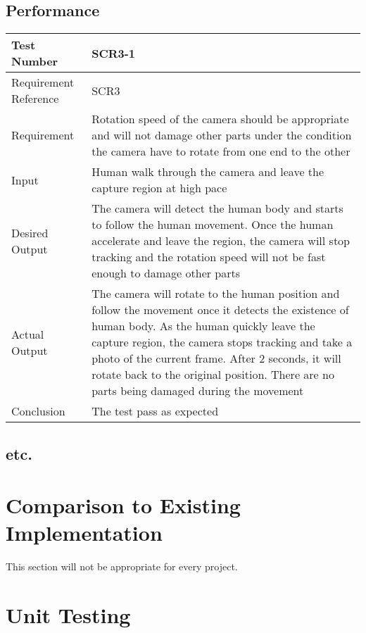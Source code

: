 \documentclass[12pt, titlepage]{article}
\begin{document}
\subsection{Performance}
\begin{table}[H]
\begin{center}
\begin{tabular}{|p{} | p{}|}
\hline
  Test Number & SCR3-1\\
  \hline
  Requirement Reference & SCR3\\
  \hline
  Requirement &  Rotation speed of the camera should be appropriate and will not damage other parts under the condition the camera have to rotate from one end to the other\\
  \hline
  Input & Human walk through the camera and leave the capture region at high pace\\
  \hline
  Desired Output & The camera will detect the human body and starts to follow the human movement. Once the human accelerate and leave the region, the camera will stop tracking and the rotation speed will not be fast enough to damage other parts\\
  \hline
  Actual Output & The camera will rotate to the human position and follow the movement once it detects the existence of human body. As the human quickly leave the capture region, the camera stops tracking and take a photo of the current frame. After 2 seconds, it will rotate back to the original position. There are no parts being damaged during the movement \\
  \hline
  Conclusion & The test pass as expected\\
  \hline
\end{tabular}
\end{center}           
\end{table}
\subsection{etc.}
	
\section{Comparison to Existing Implementation}	

This section will not be appropriate for every project.

\section{Unit Testing}
\end{document}
